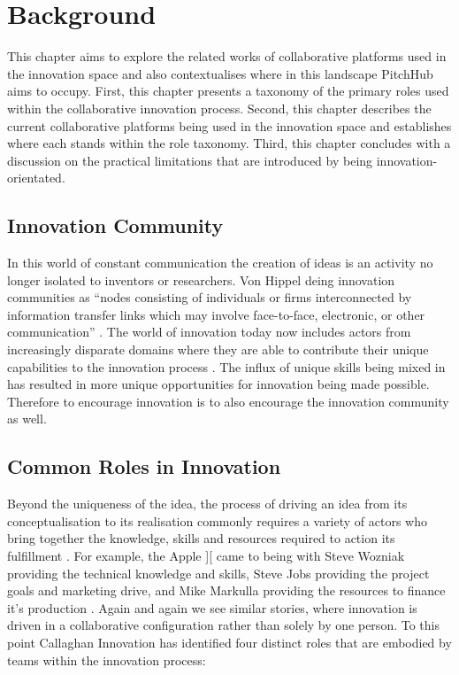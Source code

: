 \chapter{Background}

This chapter aims to explore the related works of collaborative platforms used in the innovation space and also contextualises where in this landscape PitchHub aims to occupy. First, this chapter presents a taxonomy of the primary roles used within the collaborative innovation process. Second, this chapter describes the current collaborative platforms being used in the innovation space and establishes where each stands within the role taxonomy. Third, this chapter concludes with a discussion on the practical limitations that are introduced by being innovation-orientated.

\section{Innovation Community}
In this world of constant communication the creation of ideas is an activity no longer isolated to inventors or researchers. Von Hippel deing innovation communities as ``nodes consisting of individuals or firms interconnected by information transfer links which may involve face-to-face, electronic, or other communication'' \cite{von2005democratizing}. The world of innovation today now includes actors from increasingly disparate domains where they are able to contribute their unique capabilities to the innovation process \cite{che2003optimal}. The influx of unique skills being mixed in has resulted in more unique opportunities for innovation being made possible. Therefore to encourage innovation is to also encourage the innovation community as well.

\section{Common Roles in Innovation}\label{commonRolesInInnovation}

Beyond the uniqueness of the idea, the process of driving an idea from its conceptualisation to its realisation commonly requires a variety of actors who bring together the knowledge, skills and resources required to action its fulfillment \cite{engelberger1982robotics}. For example, the Apple ][ came to being with Steve Wozniak providing the technical knowledge and skills, Steve Jobs providing the project goals and marketing drive, and Mike Markulla providing the resources to finance it's production \cite{livingston2007founders}. Again and again we see similar stories, where innovation is driven in a collaborative configuration rather than solely by one person. To this point Callaghan Innovation has identified four distinct roles that are embodied by teams within the innovation process:

